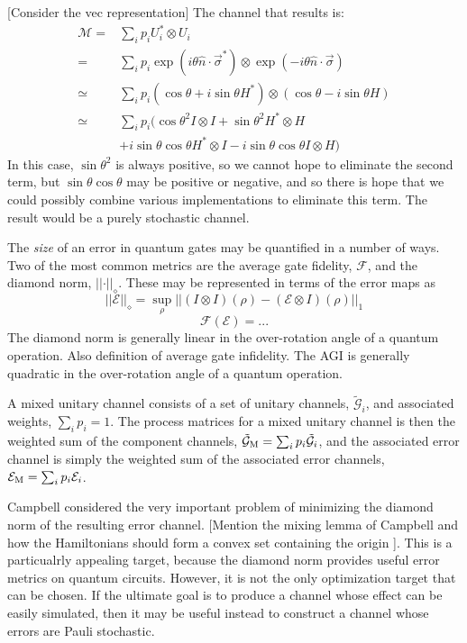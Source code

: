 \documentclass[aps,nofootinbib,pra,notitlepage,twocolumn]{revtex4-1}
\newcommand{\note}[1]{{\color{red}[#1]}}
\newcommand{\actual}{\ensuremath{\tilde{\mathcal{G}}}}
\newcommand{\error}{\ensuremath{{\mathcal{E}}}}
\begin{document}
\note{Consider the vec representation} The channel that results is:
\begin{align}
	\mathcal{M} 
		=& \sum_i p_i U^*_i \otimes U_i \\
		=& \sum_i p_i \exp(i \theta \hat n \cdot \vec\sigma^*) \otimes \exp(-i \theta \hat n \cdot \vec\sigma) \\
		\simeq & \sum_i p_i (\cos\theta + i \sin\theta H^*)\otimes(\cos\theta -i \sin\theta H) \\
		\simeq & \sum_i p_i (\cos\theta^2 I\otimes I + \sin\theta^2 H^*\otimes H \\ & + i\sin\theta\cos\theta H^*\otimes I
								- i\sin\theta\cos\theta I\otimes H )
\end{align}
In this case, $\sin\theta^2$ is always positive, so we cannot hope to eliminate the second term, but $\sin\theta\cos\theta$ may be positive or negative, and so there is hope that we could possibly combine various implementations to eliminate this term. The result would be a purely stochastic channel. 


The \emph{size} of an error in quantum gates may  be quantified in a number of ways. Two of the most common metrics are the average gate fidelity, $\mathcal{F}$, and the diamond norm, $\vert\vert\cdot\vert\vert_\diamond$. These may be represented in terms of the error maps as
\begin{equation}
	\vert\vert \error \vert\vert_\diamond = \sup_\rho \vert \vert (I\otimes I)(\rho) - (\error \otimes I)(\rho) \vert\vert_1
\end{equation}
\begin{equation}
	\mathcal{F}(\error) = ...
\end{equation}
The diamond norm is generally linear in the over-rotation angle of a quantum operation. Also definition of average gate infidelity. The AGI is generally quadratic in the over-rotation angle of a quantum operation. 

A mixed unitary channel consists of a set of unitary channels, $\actual_i$, and associated weights, $\sum_i p_i = 1$.  The process matrices for a mixed unitary channel is then the weighted sum of the component channels, $\actual_{\rm M} = \sum_i p_i \actual_i$, and the associated error channel is simply the weighted sum of the associated error channels, $\error_{\rm M} = \sum_i p_i \error_i$. 

Campbell considered the very important problem of minimizing the diamond norm of the resulting error channel.  \note{Mention the mixing lemma of Campbell and how the Hamiltonians should form a convex set containing the origin \cite{}}. This is a particualrly appealing target, because the diamond norm provides useful error metrics on quantum circuits. However, it is not the only optimization target that can be chosen. If the ultimate goal is to produce a channel whose effect can be easily simulated, then it may be useful instead to construct a channel whose errors are Pauli stochastic. 
\end{document}
